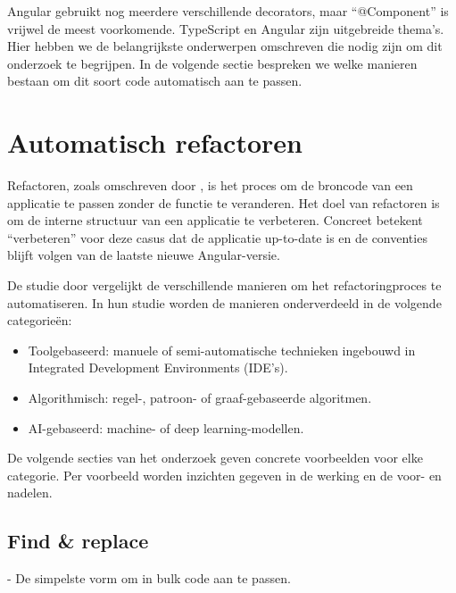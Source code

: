 Angular gebruikt nog meerdere verschillende decorators, maar ``@Component'' is vrijwel de meest voorkomende.
TypeScript en Angular zijn uitgebreide thema's.
Hier hebben we de belangrijkste onderwerpen omschreven die nodig zijn om dit onderzoek te begrijpen.
In de volgende sectie bespreken we welke manieren bestaan om dit soort code automatisch aan te passen.

\section{Automatisch refactoren}
\label{ch:stand-van-zaken:refactoring}

Refactoren, zoals omschreven door \textcite{Kaur2016}, is het proces om de broncode van een applicatie te passen zonder de functie te veranderen.
Het doel van refactoren is om de interne structuur van een applicatie te verbeteren.
Concreet betekent ``verbeteren'' voor deze casus dat de applicatie up-to-date is en de conventies blijft volgen van de laatste nieuwe Angular-versie.

De studie door \textcite{Hodovychenko2025} vergelijkt de verschillende manieren om het refactoringproces te automatiseren.
In hun studie worden de manieren onderverdeeld in de volgende categorieën:
\begin{itemize}
  \item Toolgebaseerd: manuele of semi-automatische technieken ingebouwd in Integrated Development Environments (IDE's).
  \item Algorithmisch: regel-, patroon- of graaf-gebaseerde algoritmen.
  \item AI-gebaseerd: machine- of deep learning-modellen.
\end{itemize}
De volgende secties van het onderzoek geven concrete voorbeelden voor elke categorie.
Per voorbeeld worden inzichten gegeven in de werking en de voor- en nadelen.

\subsection{Find \& replace}
\label{ch:stand-van-zaken:refactoring:find-and-replace}


- De simpelste vorm om in bulk code aan te passen.


